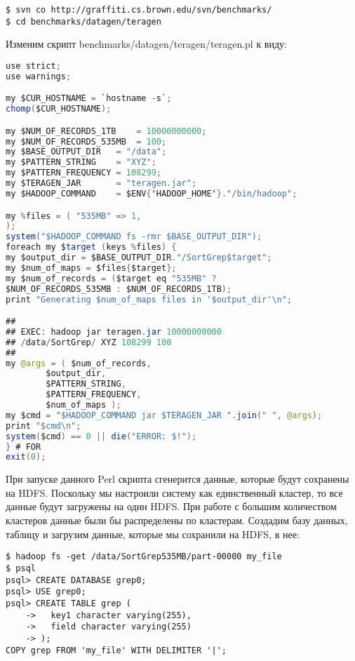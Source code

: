 \begin{lstlisting}[label=lst:haddop19,caption=Тестирование]
$ svn co http://graffiti.cs.brown.edu/svn/benchmarks/
$ cd benchmarks/datagen/teragen
\end{lstlisting}

Изменим скрипт benchmarks/datagen/teragen/teragen.pl к виду:

\begin{lstlisting}[language=Java,label=lst:haddop20,caption=Тестирование]
use strict;
use warnings;

my $CUR_HOSTNAME = `hostname -s`;
chomp($CUR_HOSTNAME);

my $NUM_OF_RECORDS_1TB    = 10000000000;
my $NUM_OF_RECORDS_535MB  = 100;
my $BASE_OUTPUT_DIR   = "/data";
my $PATTERN_STRING    = "XYZ";
my $PATTERN_FREQUENCY = 108299;
my $TERAGEN_JAR       = "teragen.jar";
my $HADOOP_COMMAND    = $ENV{'HADOOP_HOME'}."/bin/hadoop";

my %files = ( "535MB" => 1,
);
system("$HADOOP_COMMAND fs -rmr $BASE_OUTPUT_DIR");
foreach my $target (keys %files) {
my $output_dir = $BASE_OUTPUT_DIR."/SortGrep$target";
my $num_of_maps = $files{$target};
my $num_of_records = ($target eq "535MB" ?
$NUM_OF_RECORDS_535MB : $NUM_OF_RECORDS_1TB);
print "Generating $num_of_maps files in '$output_dir'\n";

##
## EXEC: hadoop jar teragen.jar 10000000000
## /data/SortGrep/ XYZ 108299 100
##
my @args = ( $num_of_records,
	    $output_dir,
	    $PATTERN_STRING,
	    $PATTERN_FREQUENCY,
	    $num_of_maps );
my $cmd = "$HADOOP_COMMAND jar $TERAGEN_JAR ".join(" ", @args);
print "$cmd\n";
system($cmd) == 0 || die("ERROR: $!");
} # FOR
exit(0);
\end{lstlisting}

При запуске данного Perl скрипта сгенерится данные, которые будут сохранены на HDFS. Поскольку мы настроили систему как единственный кластер, то все данные будут загружены на один HDFS. При работе с большим количеством кластеров данные были бы распределены по кластерам. Создадим базу данных, таблицу и загрузим данные, которые мы сохранили на HDFS, в нее:

\begin{lstlisting}[label=lst:haddop21,caption=Тестирование]
$ hadoop fs -get /data/SortGrep535MB/part-00000 my_file
$ psql
psql> CREATE DATABASE grep0;
psql> USE grep0;
psql> CREATE TABLE grep (
    ->   key1 character varying(255),
    ->   field character varying(255)
    -> );
COPY grep FROM 'my_file' WITH DELIMITER '|';
\end{lstlisting}

